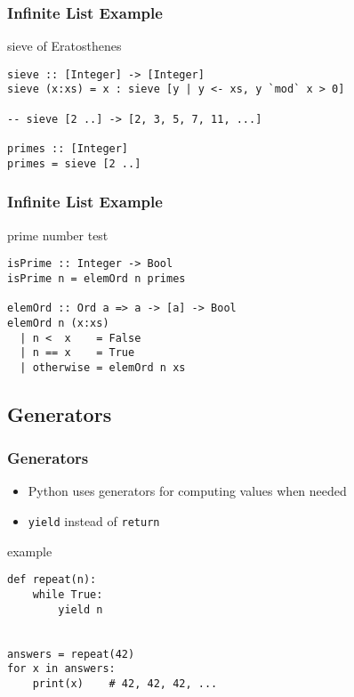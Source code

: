 \documentclass[dvipsnames]{beamer}
\theoremstyle{plain}
\begin{document}
\begin{frame}[fragile]
  \frametitle{Infinite List Example}

  \begin{exampleblock}{sieve of Eratosthenes}
    \begin{lstlisting}
sieve :: [Integer] -> [Integer]
sieve (x:xs) = x : sieve [y | y <- xs, y `mod` x > 0]

-- sieve [2 ..] -> [2, 3, 5, 7, 11, ...]

primes :: [Integer]
primes = sieve [2 ..]
    \end{lstlisting}
  \end{exampleblock}
\end{frame}

\begin{frame}[fragile]
  \frametitle{Infinite List Example}

  \begin{exampleblock}{prime number test}
    \begin{lstlisting}
isPrime :: Integer -> Bool
isPrime n = elemOrd n primes

elemOrd :: Ord a => a -> [a] -> Bool
elemOrd n (x:xs)
  | n <  x    = False
  | n == x    = True
  | otherwise = elemOrd n xs
    \end{lstlisting}
  \end{exampleblock}
\end{frame}

\subsection{Generators}


\begin{frame}[fragile]
  \frametitle{Generators}

  \begin{itemize}
    \item Python uses generators for computing values when needed
    \item \lstinline|yield| instead of \lstinline|return|
  \end{itemize}

  \begin{exampleblock}{example}
    \begin{lstlisting}
def repeat(n):
    while True:
        yield n


answers = repeat(42)
for x in answers:
    print(x)    # 42, 42, 42, ...
    \end{lstlisting}
  \end{exampleblock}
\end{frame}
\end{document}
